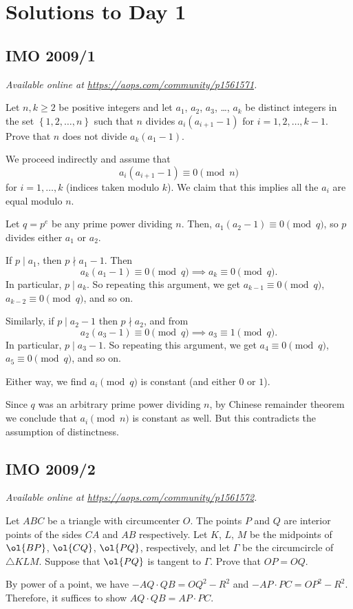 \documentclass[11pt]{scrartcl}
\begin{document}
\section{Solutions to Day 1}
\subsection{IMO 2009/1}
\textsl{Available online at \url{https://aops.com/community/p1561571}.}
\begin{mdframed}[style=mdpurplebox,frametitle={Problem statement}]
Let $n, k \ge 2$ be positive integers and let $a_1$, $a_2$, $a_3$, \dots, $a_k$
be distinct integers in the set $\left\{ 1,2,\dots,n \right\}$
such that $n$ divides $a_i(a_{i+1} - 1)$ for $i = 1,2,\dots,k-1$.
Prove that $n$ does not divide $a_k(a_1 - 1)$.
\end{mdframed}
We proceed indirectly and assume that
\[ a_i (a_{i+1}-1) \equiv 0 \pmod n \]
for $i = 1, \dots, k$ (indices taken modulo $k$).
We claim that this implies all the $a_i$ are equal modulo $n$.

Let $q = p^e$ be any prime power dividing $n$.
Then, $a_1 (a_2 - 1) \equiv 0 \pmod q$,
so $p$ divides either $a_1$ or $a_2$.
\begin{itemize}
  \ii If $p \mid a_1$, then $p \nmid a_1 - 1$.
  Then
  \[ a_k (a_1-1) \equiv 0 \pmod q
  \implies a_k \equiv 0 \pmod q. \]
  In particular, $p \mid a_k$.
  So repeating this argument,
  we get $a_{k-1} \equiv 0 \pmod q$, $a_{k-2} \equiv 0 \pmod q$, and so on.

  \ii Similarly, if $p \mid a_2 - 1$ then $p \nmid a_2$,
  and from
  \[ a_2 (a_3-1) \equiv 0 \pmod q
    \implies a_3 \equiv 1 \pmod q.  \]
  In particular, $p \mid a_3 - 1$.
  So repeating this argument,
  we get $a_4 \equiv 0 \pmod q$, $a_5 \equiv 0 \pmod q$, and so on.
\end{itemize}
Either way, we find $a_i \pmod q$ is constant (and either $0$ or $1$).

Since $q$ was an arbitrary prime power dividing $n$,
by Chinese remainder theorem we conclude that $a_i \pmod n$
is constant as well.
But this contradicts the assumption of distinctness.
\pagebreak

\subsection{IMO 2009/2}
\textsl{Available online at \url{https://aops.com/community/p1561572}.}
\begin{mdframed}[style=mdpurplebox,frametitle={Problem statement}]
Let $ABC$ be a triangle with circumcenter $O$.
The points $P$ and $Q$ are interior points of the sides $CA$ and $AB$ respectively.
Let $K$, $L$, $M$ be the midpoints of $\ol{BP}$, $\ol{CQ}$, $\ol{PQ}$,
respectively, and let $\Gamma$ be the circumcircle of $\triangle KLM$.
Suppose that $\ol{PQ}$ is tangent to $\Gamma$. Prove that $OP = OQ$.
\end{mdframed}
By power of a point, we have $-AQ \cdot QB = OQ^2 - R^2$
and $-AP \cdot PC = OP^2 - R^2$.
Therefore, it suffices to show $AQ \cdot QB = AP \cdot PC$.
\end{document}
